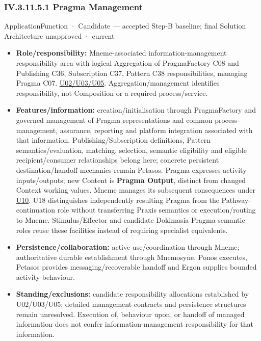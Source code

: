 \subsubsection*{IV.3.11.5.1 Pragma Management}
\label{navigation:IV.3.11.5.1}

\label{element:ab0cdaa7ed4149ee856216efa5a265c4}
{\small ApplicationFunction · Candidate — accepted Step-B baseline; final Solution Architecture unapproved · current}\par

\begin{itemize}


\item \textbf{Role/responsibility:} Mneme-associated information-management responsibility
  area with logical Aggregation of PragmaFactory C08 and Publishing C36,
  Subscription C37, Pattern C38 responsibilities, managing Pragma C07.
  \href{\detokenize{../../../../../../../../docs/markdown/05-information-systems-architecture/sources.md#u05}}{U02/U03/U05}. Aggregation/management identifies responsibility,
  not Composition or a required process/service.

\item \textbf{Features/information:} creation/initialisation through PragmaFactory and
  governed management of Pragma representations and common process-management,
  assurance, reporting and platform integration associated with that information.
  Publishing/Subscription definitions, Pattern semantics/evaluation, matching,
  selection, semantic eligibility and eligible recipient/consumer relationships
  belong here; concrete persistent destination/handoff mechanics remain Petasos.
  Pragma expresses activity inputs/outputs; new Content is \textbf{Pragma Output}, distinct
  from changed Context working values. Mneme manages its subsequent consequences
  under \hyperref[element:27ad143e7c784e378556af8a57c438f7]{U10}.
  U18 distinguishes independently resulting Pragma from the Pathway-continuation
  role without transferring Praxis semantics or execution/routing to Mneme.
  Stimulus/Effector and candidate Dokimasia Pragma semantic roles
  reuse these facilities instead of requiring specialist equivalents.

\item \textbf{Persistence/collaboration:} active use/coordination through Mneme; authoritative
  durable establishment through Mnemosyne. Ponos executes, Petasos provides
  messaging/recoverable handoff and Ergon supplies bounded activity behaviour.

\item \textbf{Standing/exclusions:} candidate responsibility allocations established by
  U02/U03/U05;
  detailed management contracts and persistence structures remain unresolved.
  Execution of, behaviour upon, or handoff of managed information does not
  confer information-management responsibility for that information.

\end{itemize}

